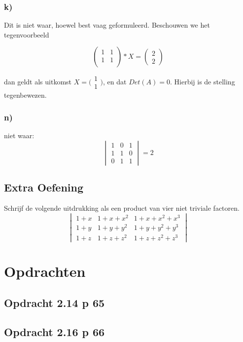 \documentclass[lineaire_algebra_oplossingen.tex]{subfiles}
\begin{document}
\subsubsection*{k)}

Dit is niet waar, hoewel best vaag geformuleerd. Beschouwen we het tegenvoorbeeld

\[
\begin{pmatrix}
1 & 1\\
1 & 1\\
\end{pmatrix}
* X = 
\begin{pmatrix}
2\\
2
\end{pmatrix}
\]

dan geldt als uitkomst $X = \bigl(\begin{smallmatrix} 1\\ 1 \end{smallmatrix} \bigr)$, en dat $Det(A) = 0$. Hierbij is de stelling tegenbewezen.

\subsubsection*{n)}
niet waar:
\[
\begin{vmatrix}
1 & 0 & 1\\
1 & 1 & 0\\
0 & 1 & 1
\end{vmatrix}
=2
\]

\subsection{Extra Oefening}
Schrijf de volgende uitdrukking als een product van vier niet triviale factoren.
\[
\begin{vmatrix}
1+x & 1+x+x^{2} & 1+x+x^{2}+x^{3}\\
1+y & 1+y+y^{2} & 1+y+y^{2}+y^{3}\\
1+z & 1+z+z^{2} & 1+z+z^{2}+z^{3}
\end{vmatrix}
\]

\section{Opdrachten}
\subsection{Opdracht 2.14 p 65}

\subsection{Opdracht 2.16 p 66}
\end{document}
